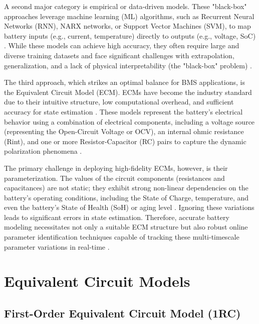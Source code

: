 \documentclass[]{article}
\begin{document}
A second major category is empirical or data-driven models. These "black-box" approaches leverage machine learning (ML) algorithms, such as Recurrent Neural Networks (RNN), NARX networks, or Support Vector Machines (SVM), to map battery inputs (e.g., current, temperature) directly to outputs (e.g., voltage, SoC) \cite{kawahara2023battery, wang2021coestimation, xia2024hybrid}. While these models can achieve high accuracy, they often require large and diverse training datasets and face significant challenges with extrapolation, generalization, and a lack of physical interpretability (the "black-box" problem) \cite{valizadeh2024machine, kawahara2023battery}.

The third approach, which strikes an optimal balance for BMS applications, is the Equivalent Circuit Model (ECM). ECMs have become the industry standard due to their intuitive structure, low computational overhead, and sufficient accuracy for state estimation \cite{tekin2024comparative}. These models represent the battery's electrical behavior using a combination of electrical components, including a voltage source (representing the Open-Circuit Voltage or OCV), an internal ohmic resistance (Rint), and one or more Resistor-Capacitor (RC) pairs to capture the dynamic polarization phenomena \cite{khalfi2021electric}.

The primary challenge in deploying high-fidelity ECMs, however, is their parameterization. The values of the circuit components (resistances and capacitances) are not static; they exhibit strong non-linear dependencies on the battery's operating conditions, including the State of Charge, temperature, and even the battery's State of Health (SoH) or aging level \cite{tran2021comprehensive}. Ignoring these variations leads to significant errors in state estimation. Therefore, accurate battery modeling necessitates not only a suitable ECM structure but also robust online parameter identification techniques capable of tracking these multi-timescale parameter variations in real-time \cite{pai2023online, yang2023improved, beelen2018experiment}.

\section{Equivalent Circuit Models}
\subsection{First-Order Equivalent Circuit Model (1RC)}
\end{document}
